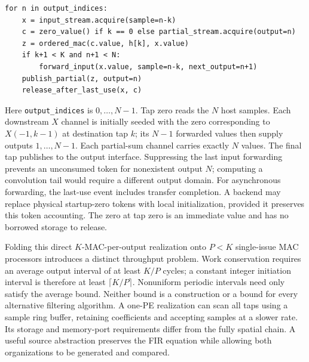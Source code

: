 \documentclass[final,3p,times,authoryear]{elsarticle}
\begin{document}
\begin{lstlisting}[float=htbp,caption={An illustrative ordered FIR tap; forwarding and release are separate actions.}]
for n in output_indices:
    x = input_stream.acquire(sample=n-k)
    c = zero_value() if k == 0 else partial_stream.acquire(output=n)
    z = ordered_mac(c.value, h[k], x.value)
    if k+1 < K and n+1 < N:
        forward_input(x.value, sample=n-k, next_output=n+1)
    publish_partial(z, output=n)
    release_after_last_use(x, c)
\end{lstlisting}

Here \texttt{output\_indices} is $0,\ldots,N-1$. Tap zero reads the $N$ host samples. Each downstream $X$ channel is initially seeded with the zero corresponding to $X(-1,k-1)$ at destination tap $k$; its $N-1$ forwarded values then supply outputs $1,\ldots,N-1$. Each partial-sum channel carries exactly $N$ values. The final tap publishes to the output interface. Suppressing the last input forwarding prevents an unconsumed token for nonexistent output $N$; computing a convolution tail would require a different output domain. For asynchronous forwarding, the last-use event includes transfer completion. A backend may replace physical startup-zero tokens with local initialization, provided it preserves this token accounting. The zero at tap zero is an immediate value and has no borrowed storage to release.

Folding this direct $K$-MAC-per-output realization onto $P<K$ single-issue MAC processors introduces a distinct throughput problem. Work conservation requires an average output interval of at least $K/P$ cycles; a constant integer initiation interval is therefore at least $\lceil K/P\rceil$. Nonuniform periodic intervals need only satisfy the average bound. Neither bound is a construction or a bound for every alternative filtering algorithm. A one-PE realization can scan all taps using a sample ring buffer, retaining coefficients and accepting samples at a slower rate. Its storage and memory-port requirements differ from the fully spatial chain. A useful source abstraction preserves the FIR equation while allowing both organizations to be generated and compared.
\end{document}
